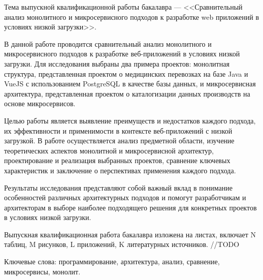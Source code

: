 
Тема выпускной квалификационной работы бакалавра --- <<Сравнительный анализ монолитного и микросервисного подходов к разработке web приложений в условиях низкой загрузки>>.

В данной работе проводится сравнительный анализ монолитного и микросервисного подходов к разработке веб-приложений в условиях низкой загрузки. Для исследования выбраны два примера проектов: монолитная структура, представленная проектом о медицинских перевозках на базе Java и VueJS с использованием PostgreSQL в качестве базы данных, и микросервисная архитектура, представленная проектом о каталогизации данных производств на основе микросервисов.

Целью работы является выявление преимуществ и недостатков каждого подхода, их эффективности и применимости в контексте веб-приложений с низкой загрузкой. В работе осуществляется анализ предметной области, изучение теоретических аспектов монолитной и микросервисной архитектур, проектирование и реализация выбранных проектов, сравнение ключевых характеристик и заключение о перспективах применения каждого подхода.

Результаты исследования представляют собой важный вклад в понимание особенностей различных архитектурных подходов и помогут разработчикам и архитекторам в выборе наиболее подходящего решения для конкретных проектов в условиях низкой загрузки.

Выпускная квалификационная работа бакалавра изложена на \pageref{LastPage} листах, включает N таблиц, M рисунков, L приложений, K литературных источников. //TODO

Ключевые слова: программирование, архитектура, анализ, сравнение, микросервисы, монолит.

\clearpage
